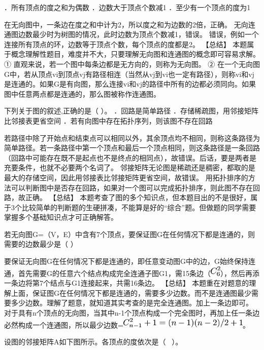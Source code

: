 ．所有顶点的度之和为偶数 ．边数大于顶点个数减1
．至少有一个顶点的度为1
\par{}
\begin{solution}在无向图中，一条边在度之和中计为2，所以度之和为边数的2倍，正确。
无向连通图边数最少时为树图的情况，此时边数为顶点个数减1，错误。
错误，例如一个连接所有顶点的环，边数等于顶点个数，每个顶点的度都是2。
【总结】
本题属于概念理解性题目，难度并不大，只要理解无向图和连通图的概念即可容易求解。
① 直观来说，若一个图中每条边都是无方向的，则称为无向图。 ②
在一个无向图G中，若从顶点vi到顶点vj有路径相连（当然从vj到vi也一定有路径），则称vi和vj是连通的。如果G是有向图，那么连接vi和vj的路径中所有的边都必须同向。如果图中任意两点都是连通的，那么图被称作连通图。
\end{solution}
\question 下列关于图的叙述,正确的是（ ）。 ．回路是简单路径
．存储稀疏图，用邻接矩阵比邻接表更省空间
．若有向图中存在拓扑序列，则该图不存在回路
\par{}
\begin{solution}若路径中除了开始点和结束点可以相同以外，其余顶点均不相同，则称这条路径为简单路径。若一条路径中第一个顶点和最后一个顶点相同，则这条路径是一条回路（回路中可能存在既不是起点也不是终点的相同点），故错误。后话，要是两者是充要条件，也就不必要两个名词了。
邻接矩阵无论图是稀疏还是稠密，都取的是最大的存储空间，因此用邻接表比邻接矩阵更省空间，故错误。
用拓扑排序的方法可以判断图中是否存在回路，如果对一个图可以完成拓扑排序，则此图不存在回路，故正确。
【总结】
本题考查了图的多个知识点，但本题目出的不是很好，属于3个比较简单的判断题的生硬拼凑，不能算是好的``综合''题。但做题的同学需要掌握多个基础知识点才可正确解答。
\end{solution}
\question 若无向图G=（V，E）中含有7个顶点，要保证图G在任何情况下都是连通的，则需要的边数最少是（
）
\par{}
\begin{solution}要保证无向图G在任何情况下都是连通的，即任意变动图G中的边，G始终保持连通，首先需要G的任意六个结点构成完全连通子图G1，需15条边（\includegraphics[width=0.19792in,height=0.19792in]{texmath/4a64ea5Cdpi7B3507DC_65E2}），然后再添一条边将第7个结点与G1连接起来，共需16条边。
【总结】
本题重在对题意的理解上面，保证图G在任何情况下都是连通的，需要多少边数。而不是连通图最少需要多少边数。理解了题意，就知道其实考查的是完全连通图。加上一条边即可。
对于具有n个顶点的无向图，当其中n-1个顶点构成一个完全图时，再加上任一条边必然构成一个连通图，所以最少边数=\includegraphics[width=2.44792in,height=0.19792in]{texmath/1a7ad05Cdpi7B3507DC_7Bn-17D5E22B13D28n-12928n-2292F22B1}。
\end{solution}
\question 设图的邻接矩阵A如下图所示。各顶点的度依次是（ ~）。~

